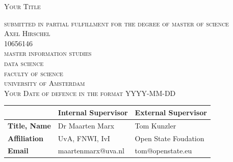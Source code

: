 \begin{titlepage}


\begin{center}
 
\textsc{\Large   Your Title }

\bigskip

\textsc{\large
submitted in partial fulfillment for the degree of master of science\\
%
\bigskip
Axel Hirschel\\
%
10656146\\
%
\bigskip
master information studies\\
%
data science \\
%
faculty of science\\
%
university of Amsterdam\\
%
\bigskip
Your Date of defence in the format YYYY-MM-DD
}

\end{center}
 

\vfill

\begin{center}
\begin{tabular}{|l||ll|}
\hline
 & \textbf{Internal  Supervisor} & \textbf{External   Supervisor}  \\   
 \hline
\textbf{Title, Name} & Dr Maarten Marx& Tom Kunzler  \\
\textbf{Affiliation} &UvA, FNWI, IvI & Open State Foudation \\ 
\textbf{Email} & maartenmarx@uva.nl&tom@openstate.eu \\
\hline
\end{tabular}
\end{center}


\bigskip


\end{titlepage}
